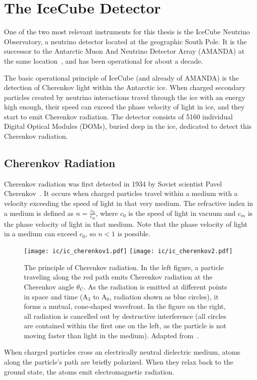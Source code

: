 \chapter{The IceCube Detector}\label{ic}
One of the two most relevant instruments for this thesis is the IceCube Neutrino Observatory, a neutrino detector located at the geographic South Pole. It is the successor to the Antarctic Muon And Neutrino Detector Array (AMANDA) at the same location~, and has been operational for about a decade.

The basic operational principle of IceCube (and already of AMANDA) is the detection of Cherenkov light within the Antarctic ice. When charged secondary particles created by neutrino interactions travel through the ice with an energy high enough, their speed can exceed the phase velocity of light in ice, and they start to emit Cherenkov radiation. The detector consists of 5160 individual Digital Optical Modules (DOMs), buried deep in the ice, dedicated to detect this Cherenkov radiation.

\section{Cherenkov Radiation}\label{cherenkov_radiation}

Cherenkov radiation was first detected in 1934 by Soviet scientist Pavel Cherenkov~. It occurs when charged particles travel within a medium with a velocity exceeding the speed of light in that very medium. The refractive index in a medium is defined as $n=\frac{c_0}{c_m}$, where $c_0$ is the speed of light in vacuum and $c_m$ is the phase velocity of light in that medium. Note that the phase velocity of light in a medium can exceed $c_0$, so $n<1$ is possible.

\begin{figure}
    \texttt{[image: ic/ic\_cherenkov1.pdf]}
    \texttt{[image: ic/ic\_cherenkov2.pdf]}
    \caption[Cherenkov radiation]{The principle of Cherenkov radiation. In the left figure, a particle traveling along the red path emits Cherenkov radiation at the Cherenkov angle $\theta_\text{C}$. As the radiation is emitted at different points in space and time ($\text{A}_3$ to $\text{A}_0$, radiation shown as blue circles), it forms a mutual, cone-shaped wavefront. In the figure on the right, all radiation is cancelled out by destructive interference (all circles are contained within the first one on the left, as the particle is not moving faster than light in the medium). Adapted from~\cite{LAnnunziata2020}.}
\end{figure}
When charged particles cross an electrically neutral dielectric medium, atoms along the particle's path are briefly polarized. When they relax back to the ground state, the atoms emit electromagnetic radiation.

